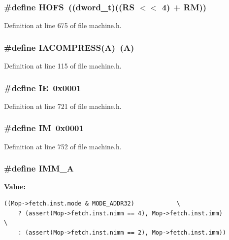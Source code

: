 \subsubsection[{HOFS}]{\setlength{\rightskip}{0pt plus 5cm}\#define HOFS~(({\bf dword\_\-t})((RS $<$$<$ 4) + RM))}\label{machine_8h_3dcc1c1a77e400803c6cb16822ec1e29}




Definition at line 675 of file machine.h.
\subsubsection[{IACOMPRESS}]{\setlength{\rightskip}{0pt plus 5cm}\#define IACOMPRESS(A)~(A)}\label{machine_8h_90492412b666a4752d5eb6d830f83aee}




Definition at line 115 of file machine.h.
\subsubsection[{IE}]{\setlength{\rightskip}{0pt plus 5cm}\#define IE~0x0001}\label{machine_8h_c4d73397b6a181409fa4b2b104e97273}




Definition at line 721 of file machine.h.
\subsubsection[{IM}]{\setlength{\rightskip}{0pt plus 5cm}\#define IM~0x0001}\label{machine_8h_51c0dfe766601d31e907fceae818a7ca}




Definition at line 752 of file machine.h.
\subsubsection[{IMM\_\-A}]{\setlength{\rightskip}{0pt plus 5cm}\#define IMM\_\-A}\label{machine_8h_0dd004deaba491bed610688cd55a7ab4}


\textbf{Value:}

\begin{Code}\begin{verbatim}((Mop->fetch.inst.mode & MODE_ADDR32)            \
    ? (assert(Mop->fetch.inst.nimm == 4), Mop->fetch.inst.imm)        \
    : (assert(Mop->fetch.inst.nimm == 2), Mop->fetch.inst.imm))
\end{verbatim}
\end{Code}



